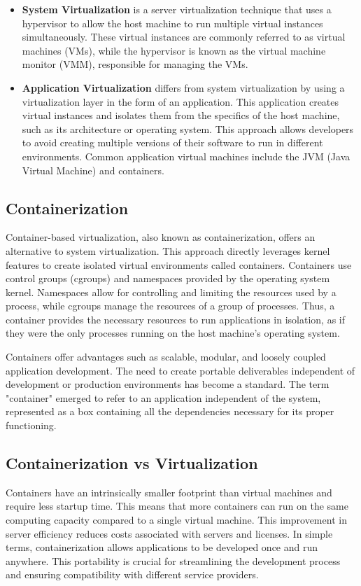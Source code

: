 \begin{itemize}
    \item \textbf{System Virtualization} is a server virtualization technique that uses a hypervisor to allow the host machine to run multiple virtual instances simultaneously. These virtual instances are commonly referred to as virtual machines (VMs), while the hypervisor is known as the virtual machine monitor (VMM), responsible for managing the VMs.
    \item \textbf{Application Virtualization} differs from system virtualization by using a virtualization layer in the form of an application. This application creates virtual instances and isolates them from the specifics of the host machine, such as its architecture or operating system. This approach allows developers to avoid creating multiple versions of their software to run in different environments. Common application virtual machines include the JVM (Java Virtual Machine) and containers.
\end{itemize}

\subsection{Containerization}
Container-based virtualization, also known as containerization, offers an alternative to system virtualization. This approach directly leverages kernel features to create isolated virtual environments called containers. Containers use control groups (cgroups) and namespaces provided by the operating system kernel. Namespaces allow for controlling and limiting the resources used by a process, while cgroups manage the resources of a group of processes. Thus, a container provides the necessary resources to run applications in isolation, as if they were the only processes running on the host machine's operating system.

Containers offer advantages such as scalable, modular, and loosely coupled application development. The need to create portable deliverables independent of development or production environments has become a standard. The term "container" emerged to refer to an application independent of the system, represented as a box containing all the dependencies necessary for its proper functioning.

\subsection{Containerization vs Virtualization}
Containers have an intrinsically smaller footprint than virtual machines and require less startup time. This means that more containers can run on the same computing capacity compared to a single virtual machine. This improvement in server efficiency reduces costs associated with servers and licenses. In simple terms, containerization allows applications to be developed once and run anywhere. This portability is crucial for streamlining the development process and ensuring compatibility with different service providers.

